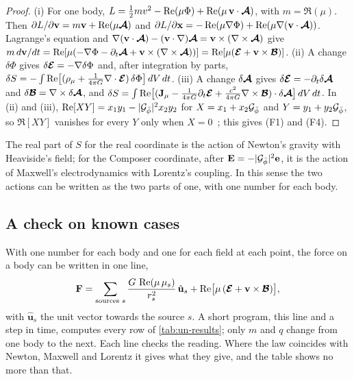 \begin{proof}
(i) For one body, $L = \tfrac12 m v^2 - \operatorname{Re}(\mu\Phi) + \operatorname{Re}(\mu\,\mathbf{v}\cdot\boldsymbol{\mathcal{A}})$, with $m = \Re(\mu)$. Then $\partial L/\partial\mathbf{v} = m\mathbf{v} + \operatorname{Re}(\mu\boldsymbol{\mathcal{A}})$ and $\partial L/\partial\mathbf{x} = -\operatorname{Re}(\mu\nabla\Phi) + \operatorname{Re}(\mu\nabla(\mathbf{v}\cdot\boldsymbol{\mathcal{A}}))$. Lagrange's equation and $\nabla(\mathbf{v}\cdot\boldsymbol{\mathcal{A}}) - (\mathbf{v}\cdot\nabla)\boldsymbol{\mathcal{A}} = \mathbf{v}\times(\nabla\times\boldsymbol{\mathcal{A}})$ give $m\,d\mathbf{v}/dt = \operatorname{Re}[\mu(-\nabla\Phi - \partial_t\boldsymbol{\mathcal{A}} + \mathbf{v}\times(\nabla\times\boldsymbol{\mathcal{A}}))] = \operatorname{Re}[\mu(\boldsymbol{\mathcal{E}} + \mathbf{v}\times\boldsymbol{\mathcal{B}})]$.
(ii) A change $\delta\Phi$ gives $\delta\boldsymbol{\mathcal{E}} = -\nabla\delta\Phi$ and, after integration by parts, $\delta S = -\int\operatorname{Re}\bigl[(\rho_\mu + \tfrac{1}{4\pi G}\nabla\cdot\boldsymbol{\mathcal{E}})\,\delta\Phi\bigr]\,dV\,dt$.
(iii) A change $\delta\boldsymbol{\mathcal{A}}$ gives $\delta\boldsymbol{\mathcal{E}} = -\partial_t\delta\boldsymbol{\mathcal{A}}$ and $\delta\boldsymbol{\mathcal{B}} = \nabla\times\delta\boldsymbol{\mathcal{A}}$, and $\delta S = \int\operatorname{Re}\bigl[(\mathbf{J}_\mu - \tfrac{1}{4\pi G}\partial_t\boldsymbol{\mathcal{E}} + \tfrac{c^2}{4\pi G}\nabla\times\boldsymbol{\mathcal{B}})\cdot\delta\boldsymbol{\mathcal{A}}\bigr]\,dV\,dt$.
In (ii) and (iii), $\operatorname{Re}[XY] = x_1y_1 - \lvert\mathcal{G}_{\bar{\phi}}\rvert^2x_2y_2$ for $X = x_1 + x_2\mathcal{G}_{\bar{\phi}}$ and $Y = y_1 + y_2\mathcal{G}_{\bar{\phi}}$, so $\Re[XY]$ vanishes for every $Y$ only when $X = 0$~\citep[Proposition~4.2]{DerrazGN2026}; this gives (F1) and (F4).
\end{proof}

The real part of $S$ for the real coordinate is the action of Newton's gravity with Heaviside's field; for the Composer coordinate, after $\mathbf{E} = -\lvert\mathcal{G}_{\bar{\phi}}\rvert^2\mathbf{e}$, it is the action of Maxwell's electrodynamics with Lorentz's coupling. In this sense the two actions can be written as the two parts of one, with one number for each body.

\subsection{A check on known cases}\label{subsec:un-tests}

With one number for each body and one for each field at each point, the force on a body can be written in one line,
\[
\mathbf{F} = \sum_{\text{sources } s} \frac{G\,\operatorname{Re}(\mu\,\mu_s)}{r_s^2}\,\hat{\mathbf{u}}_s + \operatorname{Re}\bigl[\mu\,(\boldsymbol{\mathcal{E}} + \mathbf{v}\times\boldsymbol{\mathcal{B}})\bigr] ,
\]
with $\hat{\mathbf{u}}_s$ the unit vector towards the source $s$. A short program, this line and a step in time, computes every row of \cref{tab:un-results}; only $m$ and $q$ change from one body to the next. Each line checks the reading. Where the law coincides with Newton, Maxwell and Lorentz it gives what they give, and the table shows no more than that.

